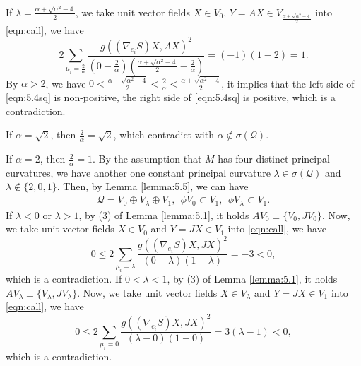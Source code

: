 \documentclass[reqno]{amsart}%
\theoremstyle{definition}
\numberwithin{equation}{section}
\begin{document}
If $\lambda=\frac{\alpha+\sqrt{\alpha^2-4}}{2}$,
we take unit vector fields $X\in V_0$, $Y=AX\in V_{\frac{\alpha+\sqrt{\alpha^2-4}}{2}}$ into \eqref{eqn:call}, we have
\begin{equation}\label{eqn:5.4sq}
2\sum_{\mu_i=\tfrac{2}{\alpha}}\frac{g((\nabla_{e_i} S)X,AX)^2}{(0-\tfrac{2}{\alpha})(\frac{\alpha+\sqrt{\alpha^2-4}}{2}-\tfrac{2}{\alpha})}
=(-1)(1-2)=1.
\end{equation}
By $\alpha>2$, we have $0<\frac{\alpha-\sqrt{\alpha^2-4}}{2}<\tfrac{2}{\alpha}<\frac{\alpha+\sqrt{\alpha^2-4}}{2}$, it implies that the left side of \eqref{eqn:5.4sq} is non-positive, the right side of \eqref{eqn:5.4sq} is positive, which is a contradiction.




If $\alpha=\sqrt{2}$, then $\tfrac{2}{\alpha}=\sqrt{2}$, which contradict with $\alpha\notin\sigma(\mathcal{Q})$.

If $\alpha=2$, then $\tfrac{2}{\alpha}=1$. By the assumption that $M$ has four distinct principal curvatures, we have another one constant principal curvature $\lambda\in\sigma(\mathcal{Q})$ and $\lambda\notin\{2,0,1\}$. Then, by Lemma \ref{lemma:5.5}, we can have
$$
\begin{aligned}
\mathcal{Q}=V_0\oplus V_\lambda\oplus V_1, \ \ \phi V_0\subset V_1,\ \ \phi V_\lambda\subset V_1.
\end{aligned}
$$
If $\lambda<0$ or $\lambda>1$, by (3) of Lemma \ref{lemma:5.1}, it holds
$AV_0\perp \{V_0,JV_0\}$. Now, we take unit vector fields $X\in V_0$ and $Y=JX\in V_1$ into \eqref{eqn:call}, we have
$$
0\leq2\sum_{\mu_i=\lambda}\frac{g((\nabla_{e_i} S)X,JX)^2}{(0-\lambda)(1-\lambda)}
=-3<0,
$$
which is a contradiction.
If $0<\lambda<1$, by (3) of Lemma \ref{lemma:5.1}, it holds
$AV_\lambda\perp \{V_\lambda,JV_\lambda\}$. Now, we take unit vector fields $X\in V_\lambda$ and $Y=JX\in V_1$ into \eqref{eqn:call}, we have
$$
0\leq2\sum_{\mu_i=0}\frac{g((\nabla_{e_i} S)X,JX)^2}{(\lambda-0)(1-0)}
=3(\lambda-1)<0,
$$
which is a contradiction.
\end{document}
